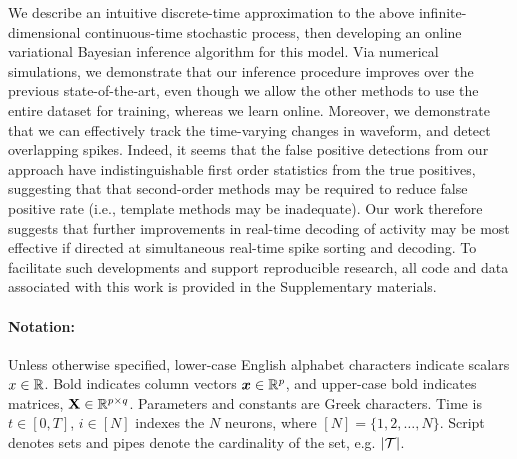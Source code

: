 We describe an intuitive discrete-time approximation to the above infinite-dimensional continuous-time stochastic process, %
then developing an online variational Bayesian inference algorithm for this model.  
Via numerical simulations, we demonstrate that our inference procedure improves over the previous state-of-the-art,
even though we allow the other methods to use the entire dataset for training, whereas we learn online.  
Moreover, we demonstrate that we can effectively track the time-varying changes in waveform, and detect overlapping spikes.  
Indeed, it seems that the false positive detections from our approach have indistinguishable first order statistics from the true positives, suggesting that that second-order methods may be required to reduce false positive rate (i.e., template methods may be inadequate).  Our work therefore suggests that further improvements in real-time decoding of activity may be most effective if directed at simultaneous real-time spike sorting and decoding.  To facilitate such developments and support reproducible research, all code and data associated with this work is provided in the Supplementary materials.


\vspace{-.12in}
\paragraph{\textbf{Notation: }}
Unless otherwise specified, lower-case English alphabet characters indicate scalars $x \in \mathbb{R}$. Bold indicates column vectors $\boldsymbol{x} \in \mathbb{R}^p$,
and upper-case bold indicates matrices, $\mathbf{X} \in \mathbb{R}^{p \times q}$.  Parameters and constants are Greek characters.  Time is $t \in [0,T]$, 
$i \in [N]$ indexes the $N$ neurons, where $[N]=\{1,2,\ldots,N\}$. Script denotes sets and pipes denote the cardinality of the set, e.g. $|\mathcal{T}|$.  
\vspace{-.1in}

